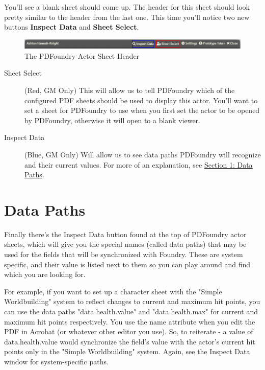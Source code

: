 \documentclass{article}
\begin{document}
    You'll see a blank sheet should come up. The header for this sheet should look pretty similar to the header from the last one. This time you'll notice two new buttons \textbf{Inspect Data} and \textbf{Sheet Select}.

    \begin{figure}[h]
        \centering
        \includegraphics[width=1\textwidth]{images/actor-sheet-viewer-header.png}
        \caption{The PDFoundry Actor Sheet Header}
        \label{fig:actor-sheet-header}
    \end{figure}

    \begin{description}

        \item [Sheet Select] (Red, GM Only) This will allow us to tell PDFoundry which of the configured PDF sheets should be used to display this actor. You'll want to set a sheet for PDFoundry to use when you first set the actor to be opened by PDFoundry, otherwise it will open to a blank viewer.

        \item [Inspect Data] (Blue, GM Only) Will allow us to see data paths PDFoundry will recognize and their current values. For more of an explanation, see \hyperref[sec:data-paths]{Section \ref{sec:data-paths}: Data Paths}.

    \end{description}

    \section{Data Paths}
    \label{sec:data-paths}

    Finally there's the Inspect Data button found at the top of PDFoundry actor sheets, which will give you the special names (called data paths) that may be used for the fields that will be synchronized with Foundry. These are system specific, and their value is listed next to them so you can play around and find which you are looking for.

    For example, if you want to set up a character sheet with the "Simple Worldbuilding" system to reflect changes to current and maximum hit points, you can use the data paths "data.health.value" and "data.health.max" for current and maximum hit points respectively. You use the name attribute when you edit the PDF in Acrobat (or whatever other editor you use). So, to reiterate - a value of data.health.value would synchronize the field's value with the actor's current hit points only in the "Simple Worldbuilding" system. Again, see the Inspect Data window for system-specific paths.
\end{document}
